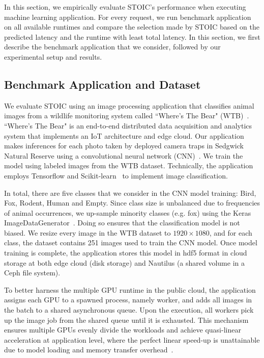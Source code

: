 In this section, we empirically evaluate STOIC's performance when executing machine learning application. For every request, we run benchmark application on all available runtimes and compare the selection made by STOIC based on the predicted latency and the runtime with least total latency. In this section, we first describe the benchmark application that we consider, followed by our experimental setup and results. 

\subsection{Benchmark Application and Dataset}

We evaluate STOIC using an image processing application that classifies animal images from a wildlife monitoring system called ``Where's The Bear" (WTB)~\cite{ref:wtb}. ``Where's The Bear" is an end-to-end distributed data acquisition and analytics system that implements an IoT architecture and edge cloud. Our application makes inferences for each photo taken by deployed camera traps in Sedgwick Natural Reserve using a convolutional neural network (CNN)~\cite{ref:cnn}.  We train the model using labeled images from the WTB dataset. Technically, the application employs Tensorflow and Scikit-learn~\cite{ref:scikit} to implement image classification.  



In total, there are five classes that we consider in the CNN model training: Bird, Fox, Rodent, Human and Empty. Since class size is unbalanced due to frequencies of animal occurrences, we up-sample minority classes (e.g. fox) using the Keras ImageDataGenerator~\cite{ref:keras}.  Doing so ensures that the classification model is not biased. We resize every image in the WTB dataset to $1920 \times 1080$, and for each class, the dataset contains 251 images used to train the CNN model. Once model training is complete, the application stores this model in hdf5 format in cloud storage at both edge cloud (disk storage) and Nautilus (a shared volume in a Ceph file system).

To better harness the multiple GPU runtime in the public cloud, the application assigns each GPU to a spawned process, namely worker, and adds all images in the batch to a shared asynchronous queue. Upon the execution, all workers pick up the image job from the shared queue until it is exhausted. This mechanism ensures multiple GPUs evenly divide the workloads and achieve quasi-linear acceleration at application level, where the perfect linear speed-up is unattainable due to model loading and memory transfer overhead~\cite{ref:multi_gpu}. 

